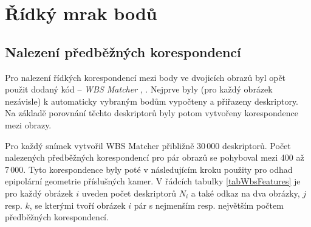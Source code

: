 \documentclass[11pt,oneside,a4paper,pdftex]{article}   %
\begin{document}

\section{Řídký mrak bodů}
	
	\subsection{Nalezení předběžných korespondencí}

		Pro nalezení řídkých korespondencí mezi body ve dvojicích obrazů byl opět použit dodaný kód --
		\emph{WBS Matcher} \cite{code_repo}, \cite{WBS_Matcher}.  Nejprve byly (pro každý obrázek
		nezávisle) k automaticky vybraným  bodům vypočteny a přiřazeny deskriptory. Na
		základě porovnání těchto deskriptorů byly potom vytvořeny korespondence mezi obrazy.
		
		Pro každý snímek vytvořil WBS Matcher přibližně 30\,000 deskriptorů. Počet nalezených předběžných
		korespondencí pro pár obrazů se pohyboval mezi 400 až 7\,000. Tyto korespondence byly poté v
		následujícím kroku použity pro odhad epipolární geometrie pří\-slu\-šných kamer.  V řádcích
		tabulky \ref{tabWbsFeatures} je pro každý obrázek $i$ uveden počet deskriptorů $N_i$ a také
		odkaz na dva obrázky, $j$ resp. $k$, se kterými tvoří obrázek $i$ pár s nejmenším resp. největším
		počtem předběžných korespondencí.
		
\end{document}
